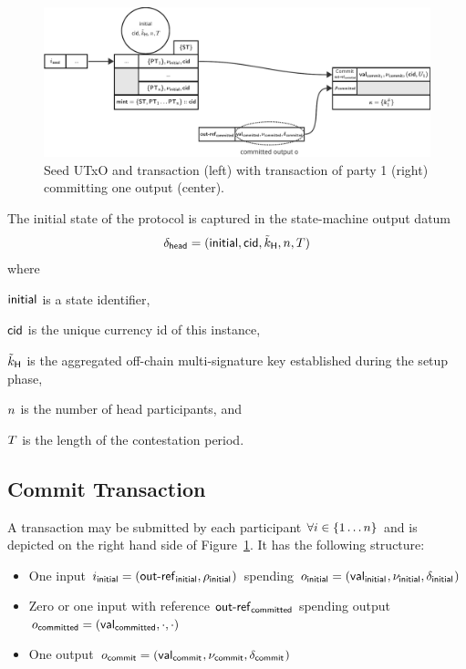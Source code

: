 \begin{figure}[h]
  \centering
  \includegraphics[width=\textwidth]{figures/SM-init-commit.pdf}
  \caption{Seed UTxO and \mtxInit{} transaction (left) with \mtxCom{}
    transaction of party 1 (right) committing one output
    (center).}\label{fig:SM-init-commit}
\end{figure}

\begin{samepage}
\noindent The initial state of the protocol is captured in the state-machine output datum
\[
  \delta_{\mathsf{head}} = (\mathsf{initial},\mathsf{cid},\tilde{k}_{\mathsf{H}},n,T)
\]
where
\begin{mitemize}
  \item $\mathsf{initial}$ is a state identifier,
  \item $\mathsf{cid}$ is the unique currency id of this instance,
  \item $\tilde{k}_{\mathsf{H}}$ is the aggregated off-chain multi-signature key established during the
  setup phase,
  \item $n$ is the number of head participants, and
  \item $T$ is the length of the contestation period.
\end{mitemize}
\end{samepage}

\subsection{Commit Transaction}\label{sec:commit-tx}

A \mtxCom{} transaction may be submitted by each participant
$\forall i \in \{1 \dots n\}$ and is depicted on the right hand side of
Figure~\ref{fig:SM-init-commit}. It has the following structure:
\begin{itemize}
  \item One input $i_{\mathsf{initial}} = (\mathsf{out\textsf{-}{}ref}_{\mathsf{initial}}, \rho_{\mathsf{initial}_{}})$
        spending $o_{\mathsf{initial}} = (\mathsf{val}_{\mathsf{initial}_{}}, \nu_{\mathsf{initial}}, \delta_{\mathsf{initial}_{}})$
  \item Zero or one input with reference
        $\mathsf{out\textsf{-}{}ref}_{\mathsf{committed}}$ spending output
        $o_{\mathsf{committed}} = (\mathsf{val}_{\mathsf{committed}}, \cdot , \cdot)$
  \item One output $o_{\mathsf{commit}} = (\mathsf{val}_{\mathsf{commit}_{}}, \nu_{\mathsf{commit}}, \delta_{\mathsf{commit}_{}})$
\end{itemize}

